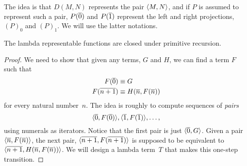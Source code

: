 \documentclass[../../include/open-logic-section]{subfiles}
\begin{document}
The idea is that $D(M,N)$ represents the pair $\langle M, N \rangle$, and if
$P$ is assumed to represent such a pair, $P(\overline{0})$ and $P(\overline{1})$
represent the left and right projections, $(P)_0$ and $(P)_1$. We will
use the latter notations.

\begin{lem}
The lambda representable functions are closed under primitive recursion.
\end{lem}

\begin{proof}
We need to show that given any terms, $G$ and $H$, we can find a term
$F$ such that
\begin{align*}
F(\num{0}) & \equiv G \\
F(\num{n+1}) & \equiv H(\num{n}, F(\num{n}))
\end{align*}
for every natural number~$n$. The idea is roughly to compute sequences
of \emph{pairs}
\[
\langle \overline{0}, F(\overline{0}) \rangle, \langle \overline{1}, F(\overline{1}) \rangle, \dots, 
\]
using numerals as iterators. Notice that the first pair is just
$\langle \overline{0}, G \rangle$. Given a pair $\langle \overline{n}, F(\overline{n}) \rangle$, the
next pair, $\langle \overline{n+1}, F(\overline{n+1}) \rangle$ is supposed to
be equivalent to $\langle \overline{n+1}, H(\overline{n}, F(\overline{n})) \rangle$. We
will design a lambda term~$T$ that makes this one-step transition.


\end{proof}
\end{document}
